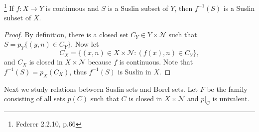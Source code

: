 \begin{corollary}
  \footnote{Federer 2.2.10, p.66}
	If $f:X\to Y$ is continuous and $S$ is a Suslin subset of $Y$, then
	$f^{-1}(S)$ is a Suslin subset of $X$.
\end{corollary}
\begin{proof}
	By definition, there is a closed set $C_Y\in Y\times\mathcal{N}$ such that
	$S=p_Y\{(y,n)\in C_Y\}$. Now let
	\[
		C_X = \{(x,n)\in X\times\mathcal{N}: (f(x),n)\in C_Y\},
	\]
  and $C_X$ is closed in $X\times\mathcal{N}$ because $f$ is continuous.
	Note that $f^{-1}(S)=p_X(C_X)$, thus $f^{-1}(S)$ is Suslin in $X$. 
\end{proof}

Next we study relations between Suslin sets and Borel sets. Let $F$ be the
family consisting of all sets $p(C)$ such that $C$ is closed in 
$X\times \mathcal{N}$ and $p|_C$ is univalent.

